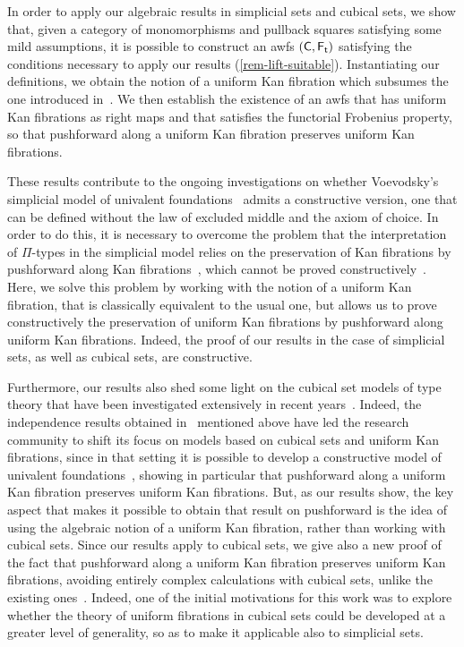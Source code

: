 \documentclass[reqno,10pt,a4paper,oneside,draft]{amsart}
\begin{document}
In order to apply our algebraic results in simplicial sets and cubical sets, we show that, given a category of monomorphisms and pullback squares satisfying some mild assumptions, it is possible to construct an awfs $(\mathsf{C}, \mathsf{F_t})$ satisfying the conditions necessary to apply our results (\cref{rem-lift-suitable}).
Instantiating our definitions, we obtain the notion of a uniform Kan fibration which subsumes the one introduced in~\cite{cohen-et-al:cubicaltt}.
We then establish the existence of an awfs that has uniform Kan fibrations as right maps and that satisfies the functorial Frobenius property, so that pushforward along a uniform Kan fibration preserves uniform Kan fibrations.


These results contribute to the ongoing investigations on whether Voevodsky's simplicial model of univalent foundations~\cite{voevodsky-simplicial-model} admits a constructive version, \ie one that can be defined without the law of excluded middle and the axiom of choice. In order to do this, it is necessary to overcome the problem that the interpretation of
$\Pi$-types in the simplicial model relies on the preservation of Kan fibrations by pushforward along Kan fibrations~\cite[Lemma~2.3.1]{voevodsky-simplicial-model}, which cannot be proved constructively~\cite[Section~6]{coquand-non-constructivity-kan}. Here, we solve this problem by working with the notion of a uniform Kan fibration, that is classically equivalent to the usual one, but allows us to prove constructively the preservation of uniform Kan fibrations by pushforward along uniform Kan fibrations. Indeed, the proof of our results in  the case of simplicial sets, as well as cubical sets, are constructive.

Furthermore, our results also shed some light on the cubical set models of type theory that have been
investigated extensively in recent years~\cite{awodey-cubical,coquand-cubical-sets,cohen-et-al:cubicaltt,pitts-cubical-nominal,swan-awfs}. Indeed, the independence results obtained in~\cite{coquand-non-constructivity-kan} mentioned above have led the research community to shift its focus on models based on cubical sets and uniform Kan fibrations, since in that setting it is possible to develop a constructive model of univalent foundations~\cite{cohen-et-al:cubicaltt}, showing in particular that pushforward along a uniform Kan fibration preserves uniform Kan fibrations. But, as our results show, the key aspect that makes it possible to obtain that result on pushforward is the idea of using the algebraic notion of a uniform Kan fibration, rather than working with cubical sets. Since our results apply to cubical sets, we give also a new proof of the fact that pushforward along a uniform Kan fibration preserves uniform Kan fibrations, avoiding entirely complex calculations with cubical sets, unlike the existing ones~\cite{cohen-et-al:cubicaltt,huber-thesis}.
Indeed, one of the initial motivations for this work was to explore whether the theory of uniform fibrations in cubical sets could be developed at a greater level of generality, so as to make it applicable also to simplicial sets.
\end{document}
